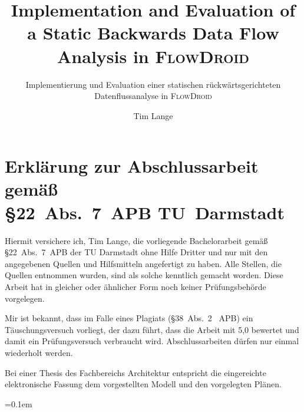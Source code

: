 \documentclass[
	english,
	ruledheaders=section,%
	class=report,%
	thesis={type=bachelor},%
	accentcolor=9c,%
	custommargins=true,%
	marginpar=false,%
	parskip=half-,%
	fontsize=11pt,%
	IMRAD=false,
	instbox=false,
]{tudapub}
\title{Implementation and Evaluation of a Static Backwards Data Flow Analysis in \textsc{FlowDroid}}
\subtitle{Implementierung und Evaluation einer statischen rückwärtsgerichteten Datenflussanalyse in \textsc{FlowDroid}}
\author[T. Lange]{Tim Lange}%
\institute{Fraunhofer SIT}
\begin{document}
\maketitle

\tableofcontents
\newpage

\section*{Erklärung zur Abschlussarbeit gemäß\\ \S{}22~Abs.~7~APB TU~Darmstadt}
\begin{sloppypar}%
Hiermit versichere ich, Tim Lange, die vorliegende Bachelorarbeit gemäß \S{}22~Abs.~7~APB der TU Darmstadt ohne Hilfe Dritter und nur mit den angegebenen Quellen und Hilfsmitteln angefertigt zu haben.
Alle Stellen, die Quellen entnommen wurden, sind als solche kenntlich gemacht worden. Diese Arbeit hat in gleicher oder ähnlicher Form noch keiner Prüfungsbehörde vorgelegen.
\end{sloppypar}%
\par
Mir ist bekannt, dass im Falle eines Plagiats (\S{}38~Abs.~2 ~APB) ein Täuschungsversuch vorliegt, der dazu führt, dass die Arbeit mit 5,0 bewertet und damit ein Prüfungsversuch verbraucht wird. Abschlussarbeiten dürfen nur einmal wiederholt werden.
\par
Bei einer Thesis des Fachbereichs Architektur entspricht die eingereichte elektronische Fassung dem vorgestellten Modell und den vorgelegten Plänen.
\AffidavitSignature

\vspace*{\fill}
\begin{center}
	\begin{minipage}{0.9\textwidth}
		\doclicenseThis
	\end{minipage}
\end{center}










{
	\emergencystretch=0.1em
	\printbibliography[
		heading=bibintoc,
		title={Bibliography}
	]
}


\end{document}
